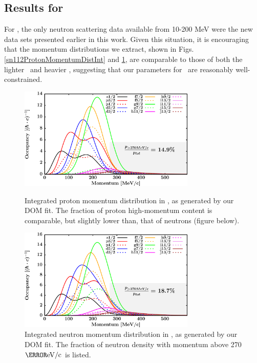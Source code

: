 \subsection{Results for \snTwelve}
For \snTwelve, the only neutron scattering data available from 10-200 MeV were the new data sets
presented earlier in this work. Given this situation, it is encouraging that the momentum
distributions we extract, shown in Figs. \ref{sn112ProtonMomentumDistInt} and
\ref{sn112NeutronMomentumDistInt}, are comparable to those of both the
lighter \niEight\ and heavier \pbEight, suggesting that our parameters for \snTwelveFour\ are
reasonably well-constrained.
\begin{figure}[tb]
    \centering
    \includegraphics[width=0.75\textwidth]{figures/sn112_protonLJMomentumDistIntegral.png}
    \caption[Proton momentum distribution in \snTwelve]
    {
        Integrated proton momentum distribution in \snTwelve, as generated
        by our DOM fit. The fraction of proton high-momentum content is
        comparable, but slightly lower than, that of neutrons (figure below).
    }
    \label{sn112ProtonMomentumDistInt}
    \vspace{16pt}
    \includegraphics[width=0.75\textwidth]{figures/sn112_neutronLJMomentumDistIntegral.png}
    \caption[Neutron momentum distributions in \snTwelve]
    {
        Integrated neutron momentum distribution in \snTwelve, as generated
        by our DOM fit. The fraction of neutron density with
        momentum above 270 $\mega\electronvolt/\text{c}$ is listed.
    }
    \label{sn112NeutronMomentumDistInt}
\end{figure}

